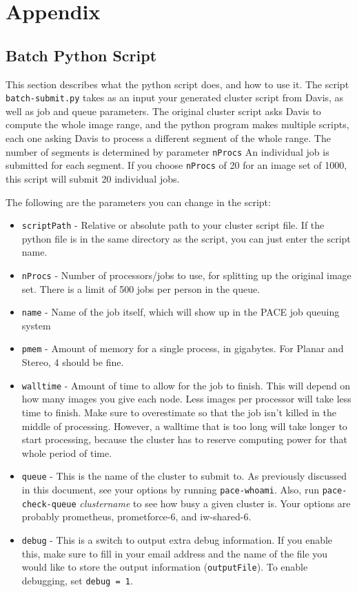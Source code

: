 \documentclass{article}
\begin{document}
    \newpage
	\section{Appendix}
	\subsection{Batch Python Script}
	\label{batch-submit}
	This section describes what the python script does, and how to use it.
	The script \texttt{batch-submit.py} takes as an input your generated cluster script from Davis, as well as job and queue parameters.  The original cluster script asks Davis to compute the whole image range, and the python program makes multiple scripts, each one asking Davis to process a different segment of the whole range.  The number of segments is determined by parameter \texttt{nProcs}  An individual job is submitted for each segment.  If you choose \texttt{nProcs} of 20 for an image set of 1000, this script will submit 20 individual jobs.
	
	The following are the parameters you can change in the script:
	\begin{itemize}
	    \item \texttt{scriptPath} - Relative or absolute path to your cluster script file.  If the python file is in the same directory as the script, you can just enter the script name.
	    \item \texttt{nProcs} - Number of processors/jobs to use, for splitting up the original image set.  There is a limit of 500 jobs per person in the queue.
	    \item \texttt{name} - Name of the job itself, which will show up in the PACE job queuing system
	    \item \texttt{pmem} - Amount of memory for a single process, in gigabytes.  For Planar and Stereo, 4 should be fine.
	    \item \texttt{walltime} - Amount of time to allow for the job to finish.  This will depend on how many images you give each node.  Less images per processor will take less time to finish.  Make sure to overestimate so that the job isn't killed in the middle of processing.  However, a walltime that is too long will take longer to start processing, because the cluster has to reserve computing power for that whole period of time.
	    \item \texttt{queue} - This is the name of the cluster to submit to.  As previously discussed in this document, see your options by running \texttt{pace-whoami}.  Also, run \texttt{pace-check-queue} \textit{clustername} to see how busy a given cluster is.  Your options are probably prometheus, prometforce-6, and iw-shared-6.
	    \item \texttt{debug} - This is a switch to output extra debug information.  If you enable this, make sure to fill in your email address and the name of the file you would like to store the output information (\texttt{outputFile}).  To enable debugging, set \texttt{debug = 1}.
	    
	\end{itemize}
	
\end{document}
